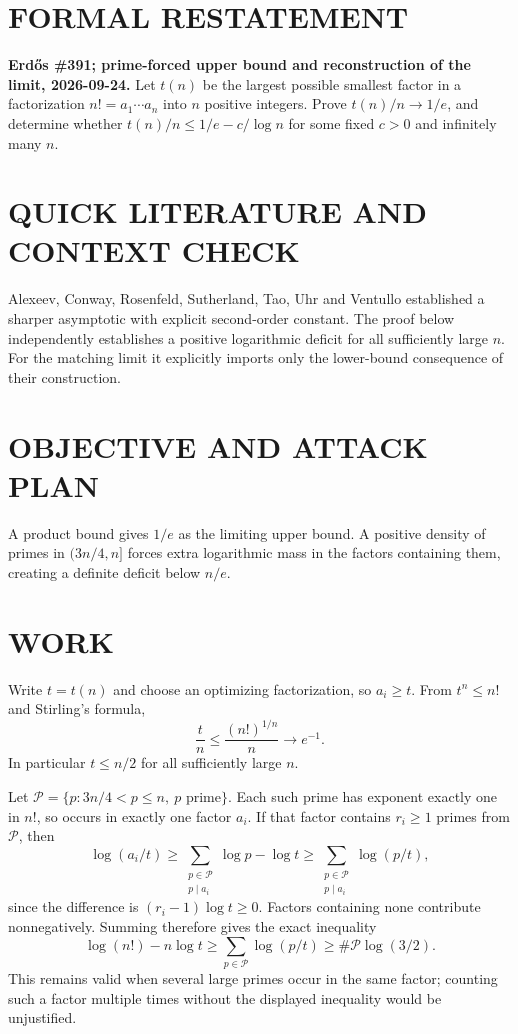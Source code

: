 \section{FORMAL RESTATEMENT}
\textbf{Erd\H{o}s \#391; prime-forced upper bound and reconstruction of the limit, 2026-09-24.}
Let $t(n)$ be the largest possible smallest factor in a factorization $n!=a_1\cdots a_n$ into $n$ positive integers. Prove $t(n)/n\to1/e$, and determine whether $t(n)/n\leq1/e-c/\log n$ for some fixed $c>0$ and infinitely many $n$.

\section{QUICK LITERATURE AND CONTEXT CHECK}
Alexeev, Conway, Rosenfeld, Sutherland, Tao, Uhr and Ventullo established a sharper asymptotic with explicit second-order constant. The proof below independently establishes a positive logarithmic deficit for all sufficiently large $n$. For the matching limit it explicitly imports only the lower-bound consequence of their construction.

\section{OBJECTIVE AND ATTACK PLAN}
A product bound gives $1/e$ as the limiting upper bound. A positive density of primes in $(3n/4,n]$ forces extra logarithmic mass in the factors containing them, creating a definite deficit below $n/e$.

\section{WORK}
Write $t=t(n)$ and choose an optimizing factorization, so $a_i\geq t$. From $t^n\leq n!$ and Stirling's formula,
\[
\frac tn\leq\frac{(n!)^{1/n}}n\longrightarrow e^{-1}.
\]
In particular $t\leq n/2$ for all sufficiently large $n$.

Let $\mathcal P=\{p:3n/4<p\leq n,\ p\text{ prime}\}$. Each such prime has exponent exactly one in $n!$, so occurs in exactly one factor $a_i$. If that factor contains $r_i\geq1$ primes from $\mathcal P$, then
\[
\log(a_i/t)\geq\sum_{\substack{p\in\mathcal P\\p\mid a_i}}\log p-\log t
\geq\sum_{\substack{p\in\mathcal P\\p\mid a_i}}\log(p/t),
\]
since the difference is $(r_i-1)\log t\geq0$. Factors containing none contribute nonnegatively. Summing therefore gives the exact inequality
\[
\log(n!)-n\log t\geq\sum_{p\in\mathcal P}\log(p/t)
\geq\#\mathcal P\log(3/2).                              \tag{1}
\]
This remains valid when several large primes occur in the same factor; counting such a factor multiple times without the displayed inequality would be unjustified.

